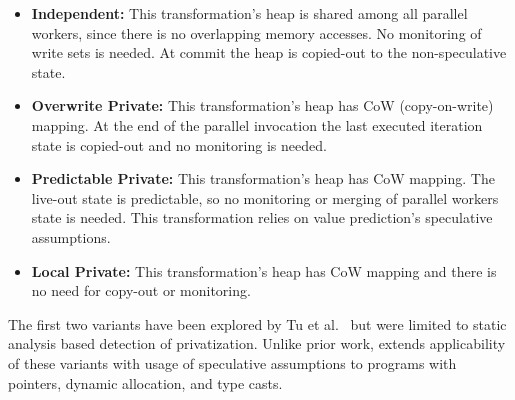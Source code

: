 
\begin{itemize}
%
\item \textbf{Independent:} This transformation's heap is shared
  among all parallel workers, since there is no overlapping memory
  accesses.
  No monitoring of write sets is needed. At commit the heap is copied-out
  to the non-speculative state.
%


\item \textbf{Overwrite Private:} This transformation's heap has
  CoW (copy-on-write) mapping. At the end of the parallel
  invocation the last executed iteration
  state is copied-out and no monitoring is needed.

%

\item \textbf{Predictable Private:} This transformation's heap
  has CoW mapping. The live-out state is predictable, so no monitoring
  or merging of parallel workers state is needed. This transformation
  relies on value prediction's speculative assumptions.

\item \textbf{Local Private:} This transformation's heap has
  CoW mapping and there is no need for copy-out or monitoring.

\end{itemize}

The first two variants have been explored by Tu et
al.~\cite{tu:94:lcbc} but were limited to static analysis
based detection of privatization. Unlike prior work, \name
extends applicability of these variants with usage of speculative
assumptions to programs with pointers, dynamic allocation, and type
casts.

